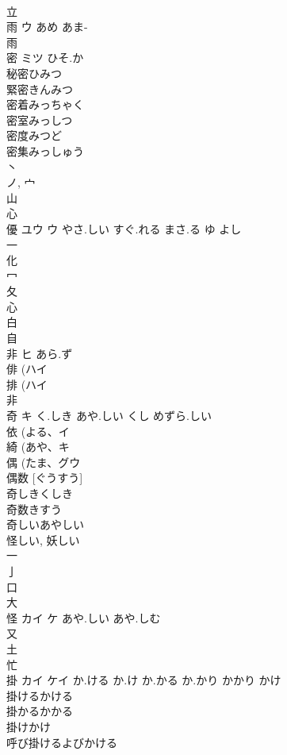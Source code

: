 \documentclass[8pt]{extreport}
\begin{document}
\begin{CJK}{UTF8}{min}
\\	立 
\\	雨	ウ	あめ あま-	
\\	雨 
\\	密	ミツ	ひそ.か	
\\	秘密ひみつ
\\	緊密きんみつ
\\	密着みっちゃく
\\	密室みっしつ
\\	密度みつど
\\	密集みっしゅう
\\	丶 
\\	ノ, 宀 
\\	山 
\\	心 
\\	優	ユウ ウ	やさ.しい すぐ.れる まさ.る ゆ よし	
\\	一 
\\	化 
\\	冖 
\\	夂 
\\	心 
\\	白 
\\	自 
\\	非	ヒ	あら.ず	
\\	俳 (ハイ 
\\	排 (ハイ 
\\	非 
\\	奇	キ	く.しき あや.しい くし めずら.しい	
\\	依 (よる、イ 
\\	綺 (あや、キ 
\\	偶 (たま、グウ 
\\	偶数 [ぐうすう] 
\\	奇しきくしき 
\\	奇数きすう 
\\	奇しいあやしい 
\\	怪しい, 妖しい 
\\	一 
\\	亅 
\\	口 
\\	大 
\\	怪	カイ ケ	あや.しい あや.しむ	
\\	又 
\\	土 
\\	忙 
\\	掛	カイ ケイ	か.ける か.け か.かる か.かり かかり かけ	
\\	掛けるかける
\\	掛かるかかる
\\	掛けかけ
\\	呼び掛けるよびかける

\end{CJK}
\end{document}
